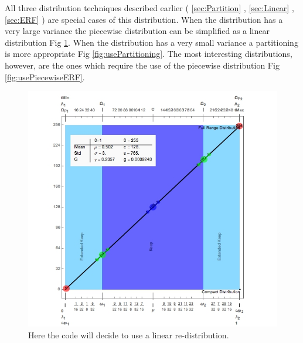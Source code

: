 All three distribution techniques described earlier ( \ref{sec:Partition} , \ref{sec:Linear} , \ref{sec:ERF} ) are special cases of this distribution. When the distribution has a very large variance the piecewise distribution can be simplified as a linear distribution Fig \ref{fig:useLinear}. When the distribution has a very small variance a partitioning is more appropriate Fig \ref{fig:usePartitioning}. The most interesting distributions, however, are the ones which require the use of the piecewise distribution Fig \ref{fig:usePiecewiseERF}. 

\begin{figure}[h]
\centering
\includegraphics[width=1\linewidth]{Chapter2/Figs/useLinear}
\caption{Here the code will decide to use a linear re-distribution.}
\label{fig:useLinear}
\end{figure}

